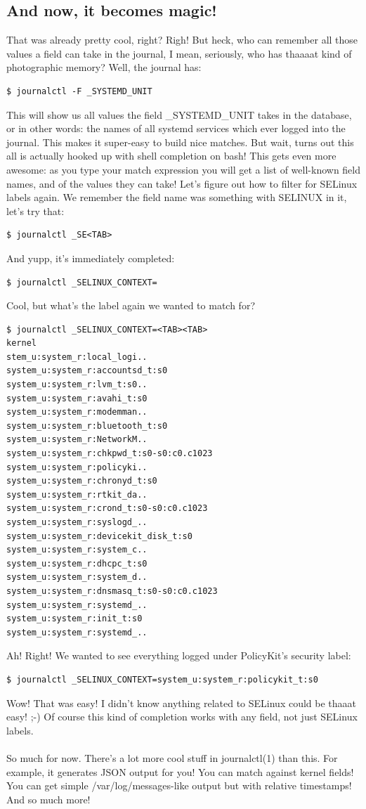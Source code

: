\documentclass[titlepage]{article}
\begin{document}
\subsection{And now, it becomes magic!}
That was already pretty cool, right? Righ! But heck, who can remember all those values a field can take in the journal, I mean, seriously, who has thaaaat kind of photographic memory? Well, the journal has:
\begin{lstlisting}
$ journalctl -F _SYSTEMD_UNIT
\end{lstlisting}
This will show us all values the field \_SYSTEMD\_UNIT takes in the database, or in other words: the names of all systemd services which ever logged into the journal. This makes it super-easy to build nice matches. But wait, turns out this all is actually hooked up with shell completion on bash! This gets even more awesome: as you type your match expression you will get a list of well-known field names, and of the values they can take! Let's figure out how to filter for SELinux labels again. We remember the field name was something with SELINUX in it, let's try that:
\begin{lstlisting}
$ journalctl _SE<TAB>
\end{lstlisting}
And yupp, it's immediately completed:
\begin{lstlisting}
$ journalctl _SELINUX_CONTEXT=
\end{lstlisting}
Cool, but what's the label again we wanted to match for?
\begin{lstlisting}
$ journalctl _SELINUX_CONTEXT=<TAB><TAB>
kernel                                       stem_u:system_r:local_logi..
system_u:system_r:accountsd_t:s0             system_u:system_r:lvm_t:s0..
system_u:system_r:avahi_t:s0                 system_u:system_r:modemman..
system_u:system_r:bluetooth_t:s0             system_u:system_r:NetworkM..
system_u:system_r:chkpwd_t:s0-s0:c0.c1023    system_u:system_r:policyki..
system_u:system_r:chronyd_t:s0               system_u:system_r:rtkit_da..
system_u:system_r:crond_t:s0-s0:c0.c1023     system_u:system_r:syslogd_..
system_u:system_r:devicekit_disk_t:s0        system_u:system_r:system_c..
system_u:system_r:dhcpc_t:s0                 system_u:system_r:system_d..
system_u:system_r:dnsmasq_t:s0-s0:c0.c1023   system_u:system_r:systemd_..
system_u:system_r:init_t:s0                  system_u:system_r:systemd_..
\end{lstlisting}
Ah! Right! We wanted to see everything logged under PolicyKit's security label:
\begin{lstlisting}
$ journalctl _SELINUX_CONTEXT=system_u:system_r:policykit_t:s0
\end{lstlisting}
Wow! That was easy! I didn't know anything related to SELinux could be thaaat easy! ;-) Of course this kind of completion works with any field, not just SELinux labels.
\\
\\
So much for now. There's a lot more cool stuff in journalctl(1) than this. For example, it generates JSON output for you! You can match against kernel fields! You can get simple /var/log/messages-like output but with relative timestamps! And so much more!
\end{document}
